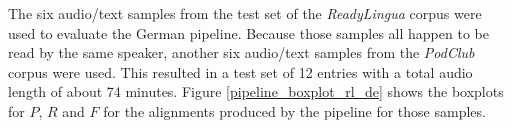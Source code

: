 

The six audio/text samples from the test set of the \textit{ReadyLingua} corpus were used to evaluate the German pipeline. Because those samples all happen to be read by the same speaker, another six audio/text samples from the \textit{PodClub} corpus were used. This resulted in a test set of 12 entries with a total audio length of about 74 minutes. Figure \ref{pipeline_boxplot_rl_de} shows the boxplots for $P$, $R$ and $F$ for the alignments produced by the pipeline for those samples.

